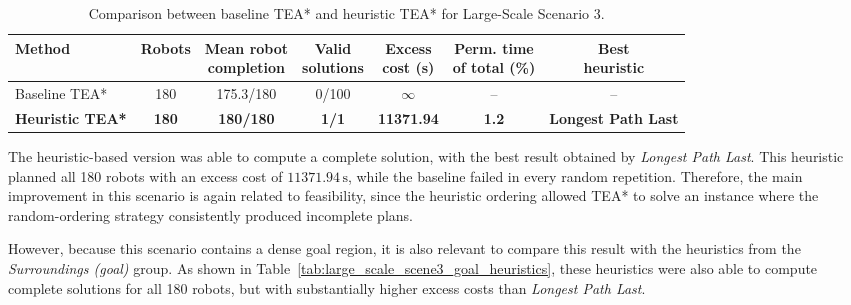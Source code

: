 \begin{table}[H]
\centering
\caption{Comparison between baseline TEA* and heuristic TEA* for Large-Scale Scenario 3.}
\label{tab:large_scale_scene3_summary}
\footnotesize
\setlength{\tabcolsep}{5pt}
\begin{tabular}{@{}lcccccc@{}}
\toprule
\textbf{Method} &
\textbf{Robots} &
\makecell{\textbf{Mean robot}\\\textbf{completion}} &
\makecell{\textbf{Valid}\\\textbf{solutions}} &
\makecell{\textbf{Excess}\\\textbf{cost (s)}} &
\makecell{\textbf{Perm. time}\\\textbf{of total (\%)}} &
\makecell{\textbf{Best}\\\textbf{heuristic}} \\
\midrule
Baseline TEA* & 180 & 175.3/180 & 0/100 & $\infty$ & -- & -- \\
\textbf{Heuristic TEA*} & \textbf{180} & \textbf{180/180} & \textbf{1/1} & \textbf{11371.94} & \textbf{1.2} & \textbf{Longest Path Last} \\
\bottomrule
\end{tabular}
\end{table}

The heuristic-based version was able to compute a complete solution, with the best result obtained
by \textit{Longest Path Last}. This heuristic planned all 180 robots with an excess cost of
\(11371.94\,\mathrm{s}\), while the baseline failed in every random repetition. Therefore, the main
improvement in this scenario is again related to feasibility, since the heuristic ordering allowed
TEA* to solve an instance where the random-ordering strategy consistently produced incomplete
plans.

However, because this scenario contains a dense goal region, it is also relevant to compare this
result with the heuristics from the \textit{Surroundings (goal)} group. As shown in
Table~\ref{tab:large_scale_scene3_goal_heuristics}, these heuristics were also able to compute
complete solutions for all 180 robots, but with substantially higher excess costs than
\textit{Longest Path Last}.

